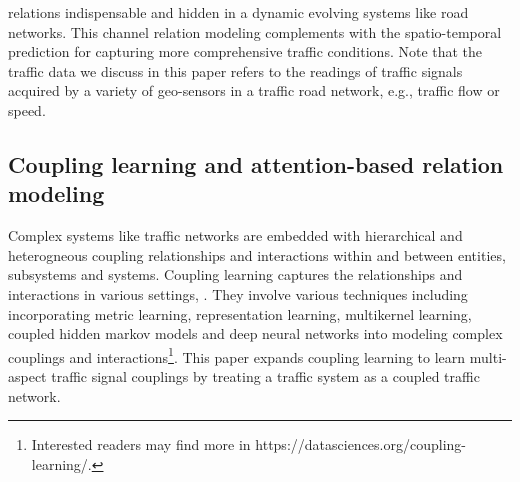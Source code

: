 relations indispensable and hidden in a dynamic evolving systems like road  networks. This channel relation modeling complements with the spatio-temporal prediction for capturing more comprehensive traffic conditions. Note that the traffic data we discuss in this paper refers to the readings of traffic signals acquired by a variety of geo-sensors in a traffic road network, e.g., traffic flow or speed. 

\subsection{Coupling learning and attention-based relation modeling}
Complex systems like traffic networks are embedded with hierarchical and heterogneous coupling relationships and interactions within and between entities, subsystems and systems. Coupling learning captures the relationships and interactions in various settings, \cite{Huaaai19,2018CoupledCF}. They involve various techniques including incorporating metric learning, representation learning, multikernel learning, coupled hidden markov models and deep neural networks into modeling complex couplings and interactions\footnote{Interested readers may find more in https://datasciences.org/coupling-learning/.}. This paper expands coupling learning to learn multi-aspect traffic signal couplings by treating a traffic system as a coupled traffic network.

